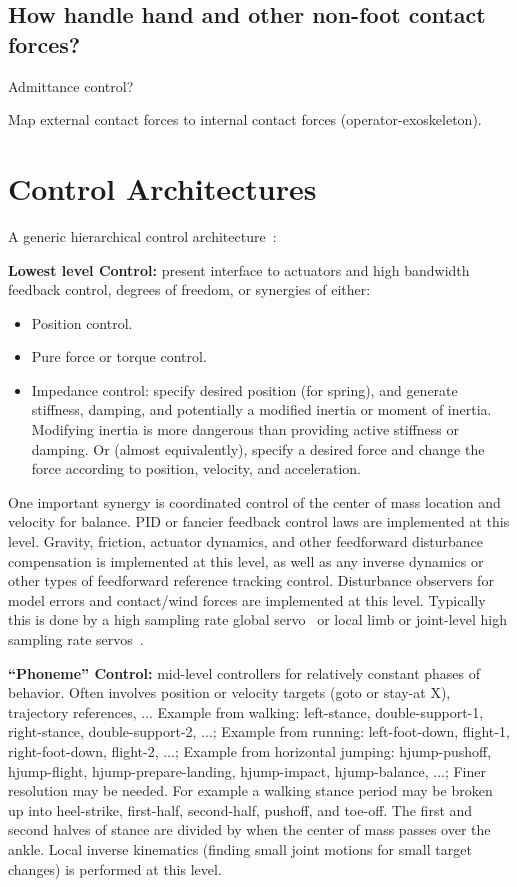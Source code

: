 \documentclass[letterpaper,12pt,fullpage]{article}
\begin{document}
\subsection{How handle hand and other non-foot contact forces?}

Admittance control?

Map external contact forces to internal contact forces (operator-exoskeleton).

\section{Control Architectures}

A generic hierarchical control architecture~\cite{IEEE06907051}:

{\bf Lowest level Control:} present interface to actuators and
high bandwidth feedback control, degrees of freedom,
or synergies of either:
\begin{itemize}
\item
Position control.
\item
Pure force or torque control.
\item
Impedance control: specify desired position (for spring), and generate
stiffness, damping, and potentially a modified inertia or moment of inertia.
Modifying inertia is more dangerous than providing active stiffness
or damping.
Or (almost equivalently),
specify a desired force and change the force according to position, velocity,
and acceleration.
\end{itemize} 
One important synergy is coordinated control of the center of mass location and
velocity for balance.
PID or fancier feedback control laws are implemented at this level.
Gravity, friction, actuator dynamics, and other feedforward disturbance
compensation is implemented at this level, as well as any inverse dynamics
or other types of feedforward reference tracking control.
Disturbance observers for model errors and contact/wind forces
are implemented at this level.
Typically this is done by a high sampling rate global servo~\cite{Atlas-robot}
or local limb or joint-level high sampling rate servos~\cite{Sarcos-robot}.

{\bf ``Phoneme'' Control:} mid-level controllers
for relatively constant phases of behavior.
Often involves position or velocity targets (goto or
stay-at X), trajectory references, ...
Example from walking: left-stance, double-support-1, right-stance, double-support-2, ...;
Example from running: left-foot-down, flight-1, right-foot-down, flight-2, ...;
Example from horizontal jumping: hjump-pushoff, hjump-flight, hjump-prepare-landing, hjump-impact, hjump-balance, ...;
Finer resolution may be needed. For example a walking stance period may
be broken up into heel-strike, first-half, second-half, pushoff, and toe-off.
The first and second halves of stance are divided by when the center of mass
passes over the ankle.
Local inverse kinematics (finding small joint motions for small target changes)
is performed at this level.
\end{document}
